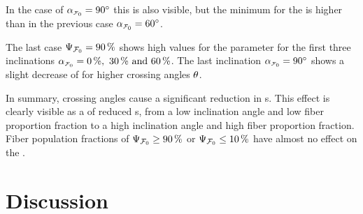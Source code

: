 In the case of $\modelInc=\SI{90}{\degree}$ this is also visible, but the minimum for the \accvalue{} is higher than in the previous case $\modelInc=\SI{60}{\degree}$.
\par
%
The last case $\textnormal{$\Psi_{\textnormal{$\mathcal{F}_0$}}$}=\SI{90}{\percent}$ shows high values for the \accvalue{} parameter for the first three inclinations $\modelInc=\SIlist{0;30;60}{\percent}$.
The last inclination $\modelInc=\SI{90}{\degree}$ shows a slight decrease of \accvalue{} for higher crossing angles $\textnormal{$\theta$}$.
\par
%
In summary, crossing angles cause a significant reduction in \accvalue{}s.
This effect is clearly visible as a  of reduced \accvalue{}s, from a low inclination angle and low fiber proportion fraction to a high inclination angle and high fiber proportion fraction.
Fiber population fractions of $\textnormal{$\Psi_{\textnormal{$\mathcal{F}_0$}}$} \geq \SI{90}{\percent}$ or $\textnormal{$\Psi_{\textnormal{$\mathcal{F}_0$}}$} \leq \SI{10}{\percent}$ have almost no effect on the \accvalue{}.
%
%
% 
\section{Discussion}
%
